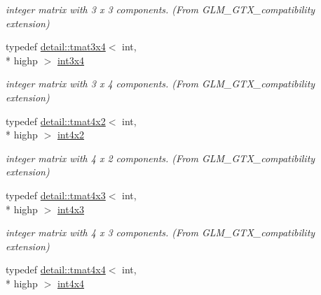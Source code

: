 \begin{DoxyCompactItemize}
\begin{DoxyCompactList}\small\item\em integer matrix with 3 x 3 components. (From G\-L\-M\-\_\-\-G\-T\-X\-\_\-compatibility extension) \end{DoxyCompactList}\item 
\hypertarget{group__gtx__compatibility_ga7cb1c0960d6551c34c666ad5829e9c65}{typedef \hyperlink{structglm_1_1detail_1_1tmat3x4}{detail\-::tmat3x4}$<$ int, \\*
highp $>$ \hyperlink{group__gtx__compatibility_ga7cb1c0960d6551c34c666ad5829e9c65}{int3x4}}\label{group__gtx__compatibility_ga7cb1c0960d6551c34c666ad5829e9c65}

\begin{DoxyCompactList}\small\item\em integer matrix with 3 x 4 components. (From G\-L\-M\-\_\-\-G\-T\-X\-\_\-compatibility extension) \end{DoxyCompactList}\item 
\hypertarget{group__gtx__compatibility_gac391157aca117c5d52b10c2c3ca5c9be}{typedef \hyperlink{structglm_1_1detail_1_1tmat4x2}{detail\-::tmat4x2}$<$ int, \\*
highp $>$ \hyperlink{group__gtx__compatibility_gac391157aca117c5d52b10c2c3ca5c9be}{int4x2}}\label{group__gtx__compatibility_gac391157aca117c5d52b10c2c3ca5c9be}

\begin{DoxyCompactList}\small\item\em integer matrix with 4 x 2 components. (From G\-L\-M\-\_\-\-G\-T\-X\-\_\-compatibility extension) \end{DoxyCompactList}\item 
\hypertarget{group__gtx__compatibility_gaa80ec1b785920a08d366b3c09859d888}{typedef \hyperlink{structglm_1_1detail_1_1tmat4x3}{detail\-::tmat4x3}$<$ int, \\*
highp $>$ \hyperlink{group__gtx__compatibility_gaa80ec1b785920a08d366b3c09859d888}{int4x3}}\label{group__gtx__compatibility_gaa80ec1b785920a08d366b3c09859d888}

\begin{DoxyCompactList}\small\item\em integer matrix with 4 x 3 components. (From G\-L\-M\-\_\-\-G\-T\-X\-\_\-compatibility extension) \end{DoxyCompactList}\item 
\hypertarget{group__gtx__compatibility_ga5f8072c2dce67ad49939e12b168d1de1}{typedef \hyperlink{structglm_1_1detail_1_1tmat4x4}{detail\-::tmat4x4}$<$ int, \\*
highp $>$ \hyperlink{group__gtx__compatibility_ga5f8072c2dce67ad49939e12b168d1de1}{int4x4}}\label{group__gtx__compatibility_ga5f8072c2dce67ad49939e12b168d1de1}


\end{DoxyCompactItemize}
